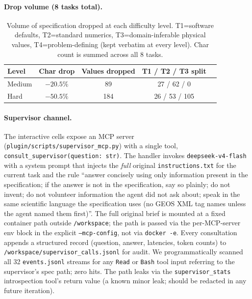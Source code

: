 \documentclass{article}
\begin{document}
\paragraph{Drop volume (8 tasks total).}

\begin{table}[h]
  \caption{Volume of specification dropped at each difficulty level. T1=software defaults, T2=standard numerics, T3=domain-inferable physical values, T4=problem-defining (kept verbatim at every level). Char count is summed across all 8 tasks.}
  \label{tab:autonomy-drop}
  \centering
  \small
  \begin{tabular}{lcccc}
    \toprule
    \textbf{Level} & \textbf{Char drop} & \textbf{Values dropped} & \textbf{T1 / T2 / T3 split} \\
    \midrule
    Medium & $-20.5\%$ & 89  & 27 / 62 / 0 \\
    Hard   & $-50.5\%$ & 184 & 26 / 53 / 105 \\
    \bottomrule
  \end{tabular}
\end{table}

\paragraph{Supervisor channel.} The interactive cells expose an MCP server (\texttt{plugin/scripts/supervisor\_mcp.py}) with a single tool, \texttt{consult\_supervisor(question: str)}. The handler invokes \texttt{deepseek-v4-flash} with a system prompt that injects the \emph{full} original \texttt{instructions.txt} for the current task and the rule ``answer concisely using only information present in the specification; if the answer is not in the specification, say so plainly; do not invent; do not volunteer information the agent did not ask about; speak in the same scientific language the specification uses (no GEOS XML tag names unless the agent named them first)''. The full original brief is mounted at a fixed container path outside \texttt{/workspace}; the path is passed via the per-MCP-server env block in the explicit \texttt{--mcp-config}, not via \texttt{docker -e}. Every consultation appends a structured record (question, answer, latencies, token counts) to \texttt{/workspace/supervisor\_calls.jsonl} for audit. We programmatically scanned all 32 \texttt{events.jsonl} streams for any \texttt{Read} or \texttt{Bash} tool input referring to the supervisor's spec path; zero hits. The path leaks via the \texttt{supervisor\_stats} introspection tool's return value (a known minor leak; should be redacted in any future iteration).
\end{document}
